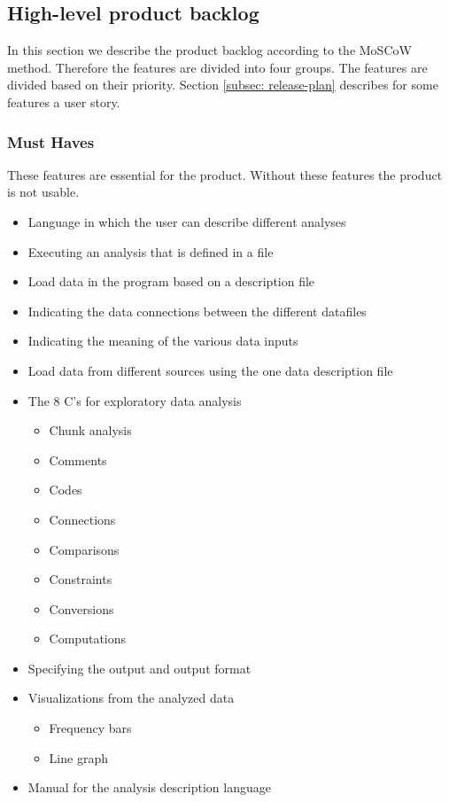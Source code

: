 \subsection{High-level product backlog}
\label{subsec: MoSCoW}
In this section we describe the product backlog according to the MoSCoW method. Therefore the features are divided into four groups. The features are divided based on their priority. Section \ref{subsec: release-plan} describes for some features a user story.
\subsubsection{Must Haves}
These features are essential for the product. Without these features the product is not usable.
\begin{itemize}
  \item Language in which the user can describe different analyses
  \item Executing an analysis that is defined in a file
  \item Load data in the program based on a description file
  \item Indicating the data connections between the different datafiles
  \item Indicating the meaning of the various data inputs
  \item Load data from different sources using the one data description file
  \item The 8 C's for exploratory data analysis
  \begin{itemize}
    \item Chunk analysis
    \item Comments
    \item Codes 
    \item Connections
    \item Comparisons
    \item Constraints
    \item Conversions
    \item Computations
  \end{itemize}
  \item Specifying the output and output format
  \item Visualizations from the analyzed data
  \begin{itemize}
  	\item Frequency bars
    \item Line graph
  \end{itemize}
  \item Manual for the analysis description language
\end{itemize}

